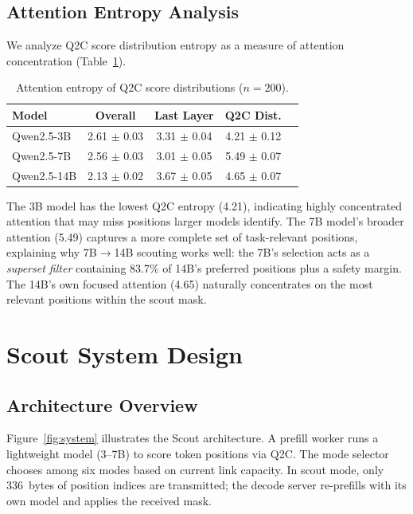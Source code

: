 \documentclass{article}
\newcommand{\QtoC}{\textsc{Q2C}\xspace}
\begin{document}
\subsection{Attention Entropy Analysis}

We analyze \QtoC score distribution entropy as a measure of attention concentration (Table~\ref{tab:entropy}).

\begin{table}[t]
\centering
\caption{Attention entropy of Q2C score distributions ($n = 200$).}
\label{tab:entropy}
\small
\begin{tabular}{@{}lcccc@{}}
\toprule
\textbf{Model} & \textbf{Overall} & \textbf{Last Layer} & \textbf{Q2C Dist.} \\
\midrule
Qwen2.5-3B  & 2.61 $\pm$ 0.03 & 3.31 $\pm$ 0.04 & 4.21 $\pm$ 0.12 \\
Qwen2.5-7B  & 2.56 $\pm$ 0.03 & 3.01 $\pm$ 0.05 & 5.49 $\pm$ 0.07 \\
Qwen2.5-14B & 2.13 $\pm$ 0.02 & 3.67 $\pm$ 0.05 & 4.65 $\pm$ 0.07 \\
\bottomrule
\end{tabular}
\end{table}

The 3B model has the lowest \QtoC entropy (4.21), indicating highly concentrated attention that may miss positions larger models identify.
The 7B model's broader attention (5.49) captures a more complete set of task-relevant positions, explaining why 7B$\to$14B scouting works well: the 7B's selection acts as a \emph{superset filter} containing 83.7\% of 14B's preferred positions plus a safety margin.
The 14B's own focused attention (4.65) naturally concentrates on the most relevant positions within the scout mask.


\section{Scout System Design}
\label{sec:system}

\subsection{Architecture Overview}

Figure~\ref{fig:system} illustrates the Scout architecture.
A prefill worker runs a lightweight model (3--7B) to score token positions via \QtoC.
The mode selector chooses among six modes based on current link capacity.
In scout mode, only 336~bytes of position indices are transmitted; the decode server re-prefills with its own model and applies the received mask.
\end{document}
